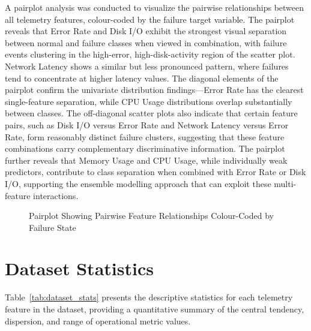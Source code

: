 \documentclass[12pt,letterpaper]{report}
\begin{document}
A pairplot analysis was conducted to visualize the pairwise relationships between all telemetry features, colour-coded by the failure target variable. The pairplot reveals that Error Rate and Disk I/O exhibit the strongest visual separation between normal and failure classes when viewed in combination, with failure events clustering in the high-error, high-disk-activity region of the scatter plot. Network Latency shows a similar but less pronounced pattern, where failures tend to concentrate at higher latency values. The diagonal elements of the pairplot confirm the univariate distribution findings---Error Rate has the clearest single-feature separation, while CPU Usage distributions overlap substantially between classes. The off-diagonal scatter plots also indicate that certain feature pairs, such as Disk I/O versus Error Rate and Network Latency versus Error Rate, form reasonably distinct failure clusters, suggesting that these feature combinations carry complementary discriminative information. The pairplot further reveals that Memory Usage and CPU Usage, while individually weak predictors, contribute to class separation when combined with Error Rate or Disk I/O, supporting the ensemble modelling approach that can exploit these multi-feature interactions.

\begin{figure}[H]
\centering
{}
\caption{Pairplot Showing Pairwise Feature Relationships Colour-Coded by Failure State}
\label{fig:pairplot}
\end{figure}

\section{Dataset Statistics}

Table~\ref{tab:dataset_stats} presents the descriptive statistics for each telemetry feature in the dataset, providing a quantitative summary of the central tendency, dispersion, and range of operational metric values.
\end{document}
